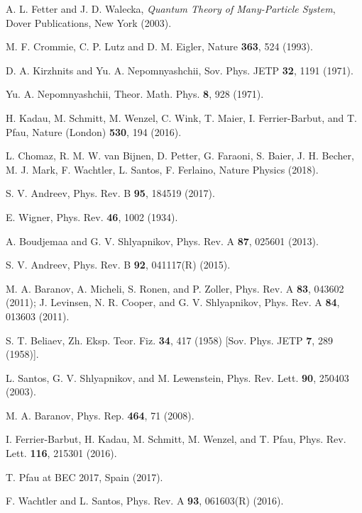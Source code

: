 \documentclass[reprint,superscriptaddress,showpacs,nofootinbib,aps,pra]{revtex4-1}
\begin{document}
\begin{thebibliography}{99}

 A. L. Fetter and J. D. Walecka, \textit{Quantum Theory of Many-Particle System}, Dover Publications, New York (2003).

 M. F. Crommie, C. P. Lutz and D. M. Eigler, Nature \textbf{363}, 524 (1993).

 D. A. Kirzhnits and Yu. A. Nepomnyashchii, Sov. Phys.
JETP \textbf{32}, 1191 (1971).

 Yu. A. Nepomnyashchii, Theor. Math. Phys. \textbf{8}, 928 (1971).

 H. Kadau, M. Schmitt, M. Wenzel, C. Wink, T. Maier, I. Ferrier-Barbut, and T. Pfau, Nature (London) \textbf{530}, 194 (2016).

 L. Chomaz, R. M. W. van Bijnen, D. Petter, G. Faraoni, S. Baier, J. H. Becher, M. J. Mark, F. Wachtler, L. Santos, F. Ferlaino, Nature Physics (2018).

 S. V. Andreev, Phys. Rev. B \textbf{95}, 184519 (2017).

 E. Wigner, Phys. Rev. \textbf{46}, 1002 (1934).

 A. Boudjemaa and G. V. Shlyapnikov, Phys. Rev. A \textbf{87}, 025601 (2013).

 S. V. Andreev, Phys. Rev. B \textbf{92}, 041117(R) (2015).

 M. A. Baranov, A. Micheli, S. Ronen, and P. Zoller, Phys. Rev. A \textbf{83}, 043602 (2011); J. Levinsen, N. R. Cooper, and G. V. Shlyapnikov, Phys. Rev. A \textbf{84}, 013603 (2011).

 S. T. Beliaev, Zh. Eksp. Teor. Fiz. \textbf{34}, 417 (1958) [Sov. Phys. JETP \textbf{7}, 289 (1958)].

 L. Santos, G. V. Shlyapnikov, and M. Lewenstein, Phys. Rev. Lett. \textbf{90}, 250403 (2003).

 M. A. Baranov, Phys. Rep. \textbf{464}, 71 (2008).

 I. Ferrier-Barbut, H. Kadau, M. Schmitt, M. Wenzel, and T. Pfau, Phys. Rev. Lett. \textbf{116}, 215301 (2016).

 T. Pfau at BEC 2017, Spain (2017).

 F. Wachtler and L. Santos, Phys. Rev. A \textbf{93}, 061603(R) (2016).


\end{thebibliography}
\end{document}
